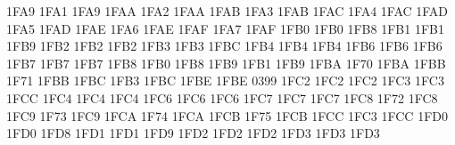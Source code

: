 \setcclcucx 1FA9 1FA1 1FA9 %
\setcclcucx 1FAA 1FA2 1FAA %
\setcclcucx 1FAB 1FA3 1FAB %
\setcclcucx 1FAC 1FA4 1FAC %
\setcclcucx 1FAD 1FA5 1FAD %
\setcclcucx 1FAE 1FA6 1FAE %
\setcclcucx 1FAF 1FA7 1FAF %
\setcclcucx 1FB0 1FB0 1FB8 %
\setcclcucx 1FB1 1FB1 1FB9 %
\setcclcucx 1FB2 1FB2 1FB2 %
\setcclcucx 1FB3 1FB3 1FBC %
\setcclcucx 1FB4 1FB4 1FB4 %
\setcclcucx 1FB6 1FB6 1FB6 %
\setcclcucx 1FB7 1FB7 1FB7 %
\setcclcucx 1FB8 1FB0 1FB8 %
\setcclcucx 1FB9 1FB1 1FB9 %
\setcclcucx 1FBA 1F70 1FBA %
\setcclcucx 1FBB 1F71 1FBB %
\setcclcucx 1FBC 1FB3 1FBC %
\setcclcucx 1FBE 1FBE 0399 %
\setcclcucx 1FC2 1FC2 1FC2 %
\setcclcucx 1FC3 1FC3 1FCC %
\setcclcucx 1FC4 1FC4 1FC4 %
\setcclcucx 1FC6 1FC6 1FC6 %
\setcclcucx 1FC7 1FC7 1FC7 %
\setcclcucx 1FC8 1F72 1FC8 %
\setcclcucx 1FC9 1F73 1FC9 %
\setcclcucx 1FCA 1F74 1FCA %
\setcclcucx 1FCB 1F75 1FCB %
\setcclcucx 1FCC 1FC3 1FCC %
\setcclcucx 1FD0 1FD0 1FD8 %
\setcclcucx 1FD1 1FD1 1FD9 %
\setcclcucx 1FD2 1FD2 1FD2 %
\setcclcucx 1FD3 1FD3 1FD3 %

